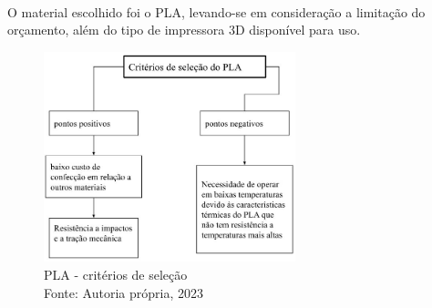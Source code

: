 \\
 O material escolhido foi o PLA, levando-se em consideração a limitação do orçamento, além do tipo de impressora 3D disponível para uso.
\\
 \begin{figure}[h]
\begin{center}
\includegraphics[width=0.65\textwidth]{figuras/pla_crite.jpg}
\caption{PLA - critérios de seleção\\Fonte: Autoria própria, 2023}
\label{tampa}
\end{center}
\end{figure}

